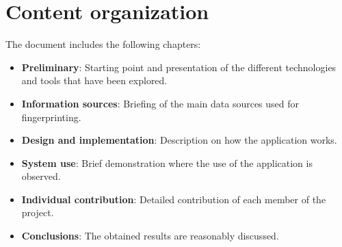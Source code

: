 \section{Content organization}
The document includes the following chapters:
\begin{itemize}
    \item \textbf{Preliminary}: Starting point and presentation of the different technologies and tools that have been explored.
    \item \textbf{Information sources}: Briefing of the main data sources used for fingerprinting.
    \item \textbf{Design and implementation}: Description on how the application works.
    \item \textbf{System use}: Brief demonstration where the use of the application is observed.
    \item \textbf{Individual contribution}: Detailed contribution of each member of the project.
    \item \textbf{Conclusions}: The obtained results are reasonably discussed.
\end{itemize}